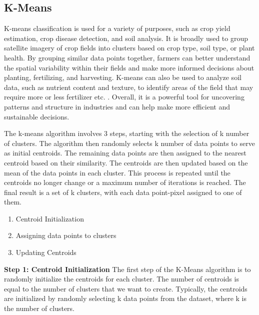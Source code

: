 \documentclass{article}
\begin{document}
{                    \subsection{K-Means}
                    
                    \hspace{0.5cm}K-means classification is used for a variety of purposes, such as crop yield estimation, crop disease detection, and soil analysis. It is broadly used to group satellite imagery of crop fields into clusters based on crop type, soil type, or plant health. By grouping similar data points together, farmers can better understand the spatial variability within their fields and make more informed decisions about planting, fertilizing, and harvesting. K-means can also be used to analyze soil data, such as nutrient content and texture, to identify areas of the field that may require more or less fertilizer etc. . Overall, it is a powerful tool for uncovering patterns and structure in industries and can help make more efficient and sustainable decisions.\par
                    The k-means algorithm involves 3 steps, starting with the selection of k number of clusters. The algorithm then randomly selects k number of data points to serve as initial centroids. The remaining data points are then assigned to the nearest centroid based on their similarity. The centroids are then updated based on the mean of the data points in each cluster. This process is repeated until the centroids no longer change or a maximum number of iterations is reached. The final result is a set of k clusters, with each data point-pixel assigned to one of them. \par

                    \begin{enumerate}
                        \item Centroid Initialization
                        \item Assigning data points to clusters
                        \item Updating Centroids
                    \end{enumerate}
                    
                    \textbf{Step 1: Centroid Initialization}
                    The first step of the K-Means algorithm is to randomly initialize the centroids for each cluster. The number of centroids is equal to the number of clusters that we want to create. Typically, the centroids are initialized by randomly selecting k data points from the dataset, where k is the number of clusters.\par

}
\end{document}

